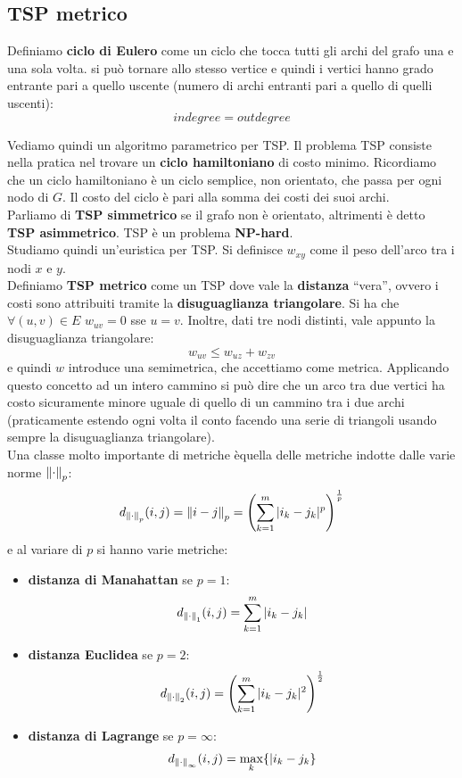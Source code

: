 \subsection{TSP metrico}
\begin{definizione}
 Definiamo \textbf{ciclo di Eulero} come un ciclo che tocca tutti gli archi
  del grafo una e una sola volta. si può tornare allo stesso vertice e quindi i
  vertici hanno grado entrante pari a quello uscente (numero di archi entranti
  pari a quello di quelli uscenti):
  \[indegree=outdegree\]
\end{definizione}
Vediamo quindi un algoritmo parametrico per TSP. Il problema TSP consiste nella
pratica nel trovare un \textbf{ciclo hamiltoniano} di costo minimo. Ricordiamo
che un ciclo hamiltoniano è un ciclo semplice, non orientato, che passa per ogni
nodo di $G$. Il costo del ciclo è pari alla somma dei costi dei suoi archi.\\ 
Parliamo di \textbf{TSP simmetrico} se il grafo non è orientato, altrimenti è
detto \textbf{TSP asimmetrico}. TSP è un problema \textbf{NP-hard}.\\
Studiamo quindi un'euristica per TSP. Si definisce $w_{xy}$ come il peso
dell'arco tra i nodi $x$ e $y$.\\
Definiamo \textbf{TSP metrico} come un TSP dove vale la \textbf{distanza}
``vera'', ovvero i costi sono attribuiti tramite la \textbf{disuguaglianza
  triangolare}. Si ha che $\forall(u,v)\in E$ $w_{uv}=0$ sse $u=v$. Inoltre,
dati tre nodi distinti, vale appunto la disuguaglianza triangolare:
\[w_{uv}\leq w_{uz}+w_{zv}\]
e quindi $w$ introduce una semimetrica, che accettiamo come metrica.
Applicando questo concetto ad un intero cammino si può dire che un arco tra due
vertici ha costo sicuramente minore uguale di quello di un cammino tra i due
archi (praticamente estendo ogni volta il conto facendo una serie di triangoli
usando sempre la disuguaglianza triangolare).\\
Una classe molto importante di metriche èquella delle metriche indotte dalle
varie norme $\norm{\cdot}_p$:
\[d_{\norm{\cdot}_p}(i,j)=\norm{i-j}_p=\left(\sum_{k=1}^m
    |i_k-j_k|^p\right)^{\frac{1}{p}}\]
e al variare di $p$ si hanno varie metriche:
\begin{itemize}
  \item \textbf{distanza di Manahattan} se $p=1$:
  \[d_{\norm{\cdot}_1}(i,j)=\sum_{k=1}^m|i_k-j_k|\]
  \item \textbf{distanza Euclidea} se $p=2$:
  \[d_{\norm{\cdot}_2}(i,j)=\left(\sum_{k=1}^m
    |i_k-j_k|^2\right)^{\frac{1}{2}}\]
  \item \textbf{distanza di Lagrange} se $p=\infty$:
  \[d_{\norm{\cdot}_\infty}(i,j)=\max_k\{|i_k-j_k\}\]
\end{itemize}
